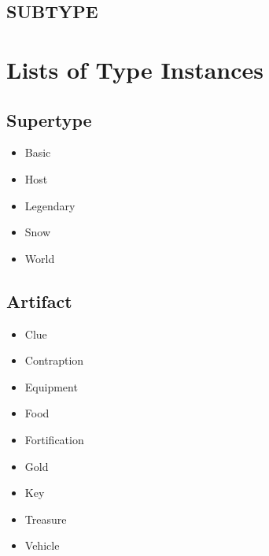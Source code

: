 \documentclass{article}
\begin{document}
\subsection{SUBTYPE}
\section{Lists of Type Instances}
\subsection{Supertype}
\begin{multicols}{3}
    \begin{itemize}
        \item Basic
        \item Host
        \item Legendary
        \item Snow
        \item World
    \end{itemize}
\end{multicols}
\subsection{Artifact}
\begin{multicols}{3}
    \begin{itemize}
        \item Clue
        \item Contraption
        \item Equipment
        \item Food
        \item Fortification
        \item Gold
        \item Key
        \item Treasure
        \item Vehicle
    \end{itemize}
\end{multicols}
\end{document}
